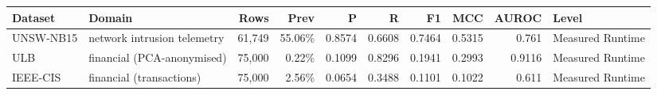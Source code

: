 \begin{tabular}{llrrrrrrrl}
\hline
Dataset & Domain & Rows & Prev & P & R & F1 & MCC & AUROC & Level \\
\hline
UNSW-NB15 & network intrusion telemetry & 61,749 & 55.06\% & 0.8574 & 0.6608 & 0.7464 & 0.5315 & 0.761 & Measured Runtime \\
ULB & financial (PCA-anonymised) & 75,000 & 0.22\% & 0.1099 & 0.8296 & 0.1941 & 0.2993 & 0.9116 & Measured Runtime \\
IEEE-CIS & financial (transactions) & 75,000 & 2.56\% & 0.0654 & 0.3488 & 0.1101 & 0.1022 & 0.611 & Measured Runtime \\
\hline
\end{tabular}
